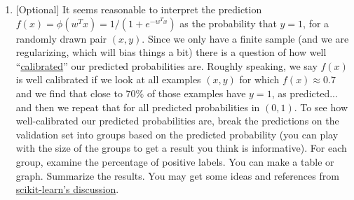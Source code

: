 \documentclass{article}
\theoremstyle{plain}
\theoremstyle{definition}
\begin{document}
\begin{enumerate}
\item {[}Optional{]} 
It seems reasonable to interpret the prediction $f(x)=\phi(w^{T}x)=1/(1+e^{-w^{T}x})$
as the probability that $y=1$, for a randomly drawn pair $\left(x,y\right)$.
Since we only have a finite sample (and we are regularizing, which
will bias things a bit) there is a question of how well ``\href{https://en.wikipedia.org/wiki/Calibration_(statistics)}{calibrated}''
our predicted probabilities are. Roughly speaking, we say $f(x)$
is well calibrated if we look at all examples $\left(x,y\right)$
for which $f(x)\approx0.7$ and we find that close to $70\%$ of those
examples have $y=1$, as predicted... and then we repeat that for
all predicted probabilities in $\left(0,1\right)$. To see how well-calibrated
our predicted probabilities are, break the predictions on the validation
set into groups based on the predicted probability (you can play with
the size of the groups to get a result you think is informative).
For each group, examine the percentage of positive labels. You can
make a table or graph. Summarize the results. You may get some ideas
and references from \href{http://scikit-learn.org/stable/modules/calibration.html}{scikit-learn's discussion}. 
\setcounter{saveenum}{\value{enumi}}
\end{enumerate}






\end{document}
